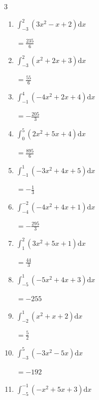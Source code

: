 \begin{multicols}{3}
\begin{enumerate}
\columnbreak %

\resetques

  \item $\displaystyle \int_{-3}^{2}\left( 3x^{2}-x+2 \right) \mathrm{d}x$

        $\displaystyle =\frac{235}{6}$

  \item $\displaystyle \int_{-3}^{2}\left( x^{2}+2x+3 \right) \mathrm{d}x$

        $\displaystyle =\frac{55}{6}$

  \item $\displaystyle \int_{-1}^{4}\left( -4x^{2}+2x+4 \right) \mathrm{d}x$

        $\displaystyle =-\frac{205}{3}$

  \item $\displaystyle \int_{0}^{5}\left( 2x^{2}+5x+4 \right) \mathrm{d}x$

        $\displaystyle =\frac{895}{6}$

  \item $\displaystyle \int_{-1}^{1}\left( -3x^{2}+4x+5 \right) \mathrm{d}x$

        $\displaystyle =-\frac{1}{3}$

\columnbreak %

  \item $\displaystyle \int_{-4}^{-2}\left( -4x^{2}+4x+1 \right) \mathrm{d}x$

        $\displaystyle =-\frac{295}{3}$

  \item $\displaystyle \int_{1}^{2}\left( 3x^{2}+5x+1 \right) \mathrm{d}x$

        $\displaystyle =\frac{44}{3}$

  \item $\displaystyle \int_{-5}^{1}\left( -5x^{2}+4x+3 \right) \mathrm{d}x$

        $\displaystyle =-255$

  \item $\displaystyle \int_{-2}^{1}\left( x^{2}+x+2 \right) \mathrm{d}x$

        $\displaystyle =\frac{5}{2}$

  \item $\displaystyle \int_{-3}^{5}\left( -3x^{2}-5x \right) \mathrm{d}x$

        $\displaystyle =-192$

\columnbreak %

  \item $\displaystyle \int_{-5}^{-1}\left( -x^{2}+5x+3 \right) \mathrm{d}x$


\end{enumerate}
\end{multicols}
